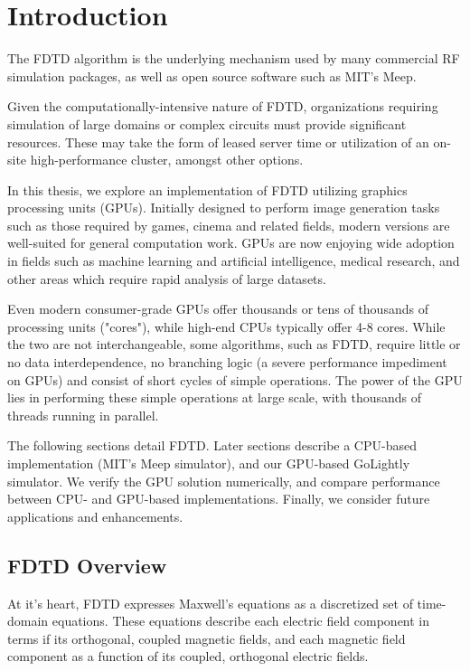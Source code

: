 \chapter{Introduction} \label{ch:introduction}

The FDTD \cite{Yee} algorithm is the underlying mechanism used by many commercial RF simulation packages, as well as open source software such as MIT's Meep\cite{OskooiRo10}. 

Given the computationally-intensive nature of FDTD, organizations requiring simulation of large domains or complex circuits must provide significant resources. These may take the form of leased server time or utilization of an on-site high-performance cluster, amongst other options.

In this thesis, we explore an implementation of FDTD utilizing graphics processing units (GPUs). Initially designed to perform image generation tasks such as those required by games, cinema and related fields, modern versions are well-suited for general computation work. GPUs are now enjoying wide adoption in fields such as machine learning\cite{Raina09largescaledeep} and artificial intelligence\cite{wu2009clustering}, medical research\cite{QIMS1079}, and other areas which require rapid analysis of large datasets.

Even modern consumer-grade GPUs offer thousands or tens of thousands of processing units ("cores"), while high-end CPUs typically offer 4-8 cores. While the two are not interchangeable, some algorithms, such as FDTD, require little or no data interdependence, no branching logic (a severe performance impediment on GPUs) and consist of short cycles of simple operations. The power of the GPU lies in performing these simple operations at large scale, with thousands of threads running in parallel. 

The following sections detail FDTD. Later sections describe a CPU-based implementation (MIT's  Meep simulator), and our GPU-based GoLightly simulator. We verify the GPU solution numerically, and compare performance between CPU- and GPU-based implementations. Finally, we consider future applications and enhancements. 


\section{FDTD Overview}

At it's heart, FDTD expresses Maxwell's equations as a discretized set of time-domain equations\cite{Yee}. These equations describe each electric field component in terms if its orthogonal, coupled magnetic fields, and each magnetic field component as a function of its coupled, orthogonal electric fields.


